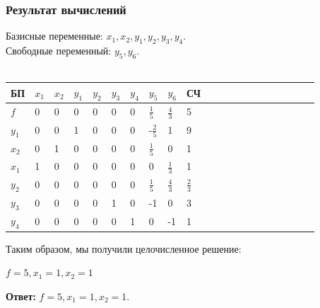 \documentclass[14pt,a4paper,fleqn]{extarticle}
\begin{document}
	\subsubsection*{Результат вычислений}
	Базисные переменные: $x_1, x_2, y_1, y_2, y_3, y_4$.\\
	Свободные переменный: $y_5, y_6$.\\\\
	\begin{tabularx}{\textwidth}{V{1}p{0.7cm}V{1}p{1.1cm}V{1}p{1.1cm}V{1}p{1.1cm}V{1}p{1.1cm}V{1}p{1.1cm}V{1}p{1.1cm}V{1}p{1.1cm}V{1}p{1.1cm}V{1}p{1.23cm}V{1}}
		\hline
		БП & $x_1$ & $x_2$ & $y_1$ & $y_2$ & $y_3$ & $y_4$ & $y_5$ & $y_6$ & СЧ\\
		\hline
		$f$ & 0 & 0 & 0 & 0 & 0 & 0 & \small $\frac{1}{5}$ & \small $\frac{4}{3}$ & 5\\
		\hline
		$y_1$ & 0 & 0 & 1 & 0 & 0 & 0 & \small -$\frac{2}{5}$ & 1 & 9\\
		\hline
		$x_2$ & 0 & 1 & 0 & 0 & 0 & 0 & \small $\frac{1}{5}$ & 0 & 1 \\
		\hline
		$x_1$ & 1 & 0 & 0 & 0 & 0 & 0 & 0 & \small $\frac{1}{3}$ & 1\\
		\hline
		$y_2$ & 0 & 0 & 0 & 0 & 0 & 0 & \small $\frac{1}{5}$ & $\frac{4}{3}$ & \small $\frac{2}{3}$\\
		\hline
		$y_3$ & 0 & 0 & 0 & 0 & 1 & 0 & -1 & 0 & 3\\
		\hline
		$y_4$ & 0 & 0 & 0 & 0 & 0 & 1 & 0 & -1 & 1\\
		\hline
	\end{tabularx}
	\newline\newline
	Таким образом, мы получили целочисленное решение:
	\begin{center}
		$f = 5, x_1 = 1, x_2 = 1$
	\end{center}
	\textbf{Ответ:} $f = 5, x_1 = 1, x_2 = 1$.
\end{document}
